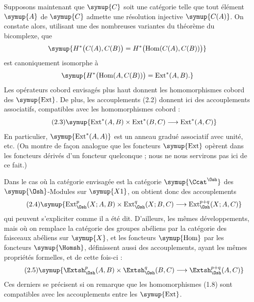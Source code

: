 Supposons maintenant que $\symup{C}$ soit une catégorie telle que tout élément $\symup{A}$
de $\symup{C}$ admette une résolution injective $\symup{C(A)}$. On constate alors, utilisant
une des nombreuses variantes du théorème du bicomplexe, que
\[
  \symup{H^{*}\bigl(C(A),C(B)\bigr)
  =H^{*}\bigl(\operatorname{Hom}(C(A),C(B))\bigr)}
\]
est canoniquement isomorphe à
\[
  \symup{H^{*}\bigl(\operatorname{Hom}(A,C(B))\bigr)
  =\operatorname{Ext}^{*}(A,B).}
\]
Les opérateurs cobord envisagés plus haut donnent les homomorphismes cobord des
$\symup{\operatorname{Ext}}$. De plus, les accouplements (2.2) donnent ici des
accouplements associatifs, compatibles avec les homomorphismes cobord :
\begin{equation}\tag{2.3}
  \symup{\operatorname{Ext}^{*}(A,B)\times\operatorname{Ext}^{*}(B,C)
  \longrightarrow\operatorname{Ext}^{*}(A,C)}
\end{equation}
En particulier, $\symup{\operatorname{Ext}^{*}(A,A)}$ est un anneau gradué associatif
avec unité, etc. (On montre de façon analogue que les foncteurs
$\symup{\operatorname{Ext}}$ opèrent dans les foncteurs dérivés d'un foncteur
quelconque ; nous ne nous servirons pas ici de ce fait.)

Dans le cas où la catégorie envisagée est la catégorie $\symup{\Ccat^{\Osh}}$ des
$\symup{\Osh}$-Modules sur $\symup{X1}$, on obtient donc des accouplements
\begin{equation}\tag{2.4}
  \symup{\operatorname{Ext}_{\Osh}^{p}(X;A,B)
  \times\operatorname{Ext}_{\Osh}^{q}(X;B,C)
  \longrightarrow\operatorname{Ext}_{\Osh}^{p+q}(X;A,C)}
\end{equation}
qui peuvent s'expliciter comme il a été dit. D'ailleurs, les mêmes
développements, mais où on remplace la catégorie des groupes abéliens par la
catégorie des faisceaux abéliens sur $\symup{X}$, et les foncteurs $\symup{\operatorname{Hom}}$
par les foncteurs $\symup{\Homsh}$, définissent aussi des accouplements, ayant les mêmes
propriétés formelles, et de  cette fois-ci :
\begin{equation}\tag{2.5}
  \symup{\Extsh_{\Osh}^{p}(A,B)\times\Extsh_{\Osh}^{q}(B,C)
  \longrightarrow\Extsh_{\Osh}^{p+q}(A,C)}
\end{equation}
Ces derniers se précisent si on remarque que les homomorphismes (1.8) sont
compatibles avec les accouplements entre les $\symup{\operatorname{Ext}}$.

